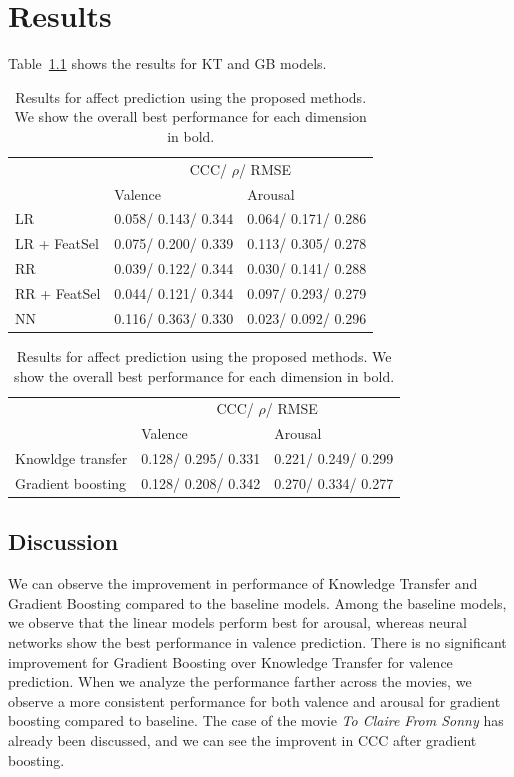 \documentclass{article}
\begin{document}
\section{Results}
Table~\ref{} shows the results for KT and GB models.



\begin{table}[t]
\centering
\caption{Results for affect prediction using the baseline regressors. The best performances for each dimension are shown in bold. {\bf Make everything having 2 significant digits}}
\begin{tabular}{@{}l|l|l@{}}
\hline
				        & \multicolumn{2}{c}{CCC/ $\rho$/ RMSE}\\ \cline{2-3}
				        & Valence       & Arousal \\ \hline
LR           & 0.058/ 0.143/ 0.344 & 0.064/ 0.171/ 0.286 \\ 
LR + FeatSel & 0.075/ 0.200/ 0.339 & 0.113/ 0.305/ 0.278 \\ 
RR           & 0.039/ 0.122/ 0.344 & 0.030/ 0.141/ 0.288 \\ 
RR + FeatSel & 0.044/ 0.121/ 0.344 & 0.097/ 0.293/ 0.279 \\ 
NN           & 0.116/ 0.363/ 0.330 & 0.023/ 0.092/ 0.296 \\ 
\end{tabular}
\label{Arousal_table}
\caption{Results for affect prediction using the proposed methods. We show the overall best performance for each dimension in bold.} 
\begin{tabular}{@{}l|l|l@{}}
\hline
				        & \multicolumn{2}{c}{CCC/ $\rho$/ RMSE}\\ \cline{2-3}
				        & Valence       & Arousal \\ \hline
Knowldge transfer& 0.128/ 0.295/ 0.331 & 0.221/ 0.249/ 0.299 \\ 
Gradient boosting& 0.128/ 0.208/ 0.342 & 0.270/ 0.334/ 0.277 \\ 
\end{tabular}
\label{Arousal_table}
\end{table}

\subsection{Discussion}
We can observe the improvement in performance of Knowledge Transfer and Gradient Boosting compared to the baseline models. Among the baseline models, we observe that the linear models perform best for arousal, whereas neural networks show the best performance in valence prediction. There is no significant improvement for Gradient Boosting over Knowledge Transfer for valence prediction. When we analyze the performance farther across the movies, we observe a more consistent performance for both valence and arousal for gradient boosting compared to baseline. The case of the movie \textit{To Claire From Sonny} has already been discussed, and we can see the improvent in CCC after gradient boosting.
\end{document}
